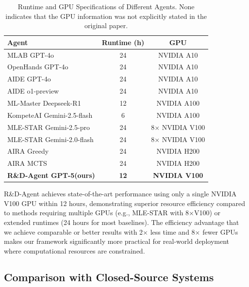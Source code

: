 \begin{table}[htbp]
\centering
\caption{Runtime and GPU Specifications of Different Agents. None indicates that the GPU information was not explicitly stated in the original paper.}
\label{tab:runtime_gpu}
\renewcommand{\arraystretch}{1.2}
\begin{tabular}{lcc}
\toprule
\textbf{Agent} & \textbf{Runtime (h)} & \textbf{GPU} \\
\midrule
MLAB GPT-4o                    &    24         &      NVIDIA A10         \\
OpenHands GPT-4o              &      24        &     NVIDIA A10           \\
AIDE GPT-4o                   &     24         &    NVIDIA A10           \\
AIDE o1-preview               &       24       &     NVIDIA A10         \\
ML-Master Deepseek-R1       &       12       &   NVIDIA  A100          \\
KompeteAI Gemini-2.5-flash   &      6        &   NVIDIA   A100         \\
MLE-STAR Gemini-2.5-pro          &     24         &     8$\times$ NVIDIA V100          \\
MLE-STAR Gemini-2.0-flash       &      24       &    8$\times$ NVIDIA V100           \\
AIRA Greedy                  &      24        &         NVIDIA H200       \\
AIRA MCTS                    &      24        &         NVIDIA H200       \\
\textbf{R\&D-Agent GPT-5(ours)}            &       \textbf{12}       &     \textbf{NVIDIA V100}        \\
\bottomrule
\end{tabular}
\end{table}

R\&D-Agent achieves state-of-the-art performance using only a single NVIDIA V100 GPU within 12 hours, demonstrating superior resource efficiency compared to methods requiring multiple GPUs (e.g., MLE-STAR with 8$\times$V100) or extended runtimes (24 hours for most baselines). The efficiency advantage that we achieve comparable or better results with 2$\times$ less time and 8$\times$ fewer GPUs makes our framework significantly more practical for real-world deployment where computational resources are constrained.

\subsection{Comparison with Closed-Source Systems}

